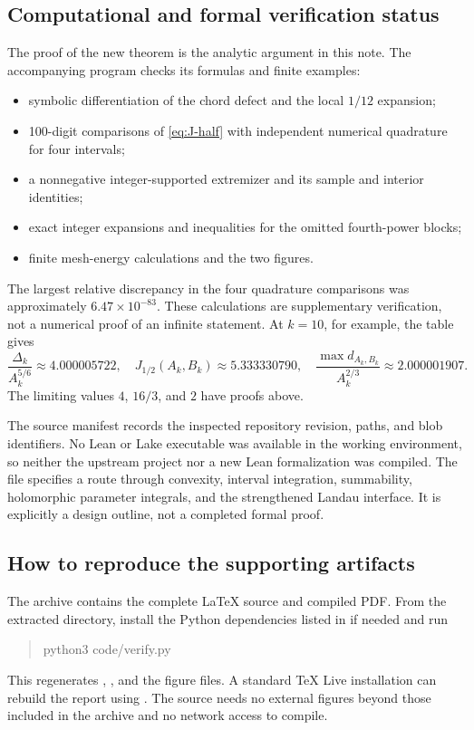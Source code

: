 \documentclass[11pt]{article}
\theoremstyle{definition}
\begin{document}
\subsection{Computational and formal verification status}

The proof of the new theorem is the analytic argument in this note.
The accompanying program checks its formulas and finite examples:
\begin{itemize}
\item symbolic differentiation of the chord defect and the local
\(1/12\) expansion;
\item 100-digit comparisons of \eqref{eq:J-half} with independent
numerical quadrature for four intervals;
\item a nonnegative integer-supported extremizer and its sample and
interior identities;
\item exact integer expansions and inequalities for the omitted
fourth-power blocks;
\item finite mesh-energy calculations and the two figures.
\end{itemize}
The largest relative discrepancy in the four quadrature comparisons
was approximately \(6.47\times10^{-83}\). These calculations are
supplementary verification, not a numerical proof of an infinite
statement. At \(k=10\), for example, the table gives
\[
 \frac{\Delta_k}{A_k^{5/6}}\approx4.000005722,
 \quad J_{1/2}(A_k,B_k)\approx5.333330790,
 \quad\frac{\max d_{A_k,B_k}}{A_k^{2/3}}\approx2.000001907.
\]
The limiting values \(4\), \(16/3\), and \(2\) have proofs above.

The source manifest records the inspected repository revision, paths,
and blob identifiers. No Lean or Lake executable was available in the
working environment, so neither the upstream project nor a new Lean
formalization was compiled. The file 
specifies a route through convexity, interval integration, summability,
holomorphic parameter integrals, and the strengthened Landau interface.
It is explicitly a design outline, not a completed formal proof.

\subsection{How to reproduce the supporting artifacts}

The archive contains the complete LaTeX source and compiled PDF. From
the extracted directory, install the Python dependencies listed in
 if needed and run
\begin{quote}\ttfamily
python3 code/verify.py
\end{quote}
This regenerates ,
, and the figure files. A standard TeX Live
installation can rebuild the report using .
The source needs no external figures beyond those included in the
archive and no network access to compile.
\end{document}
